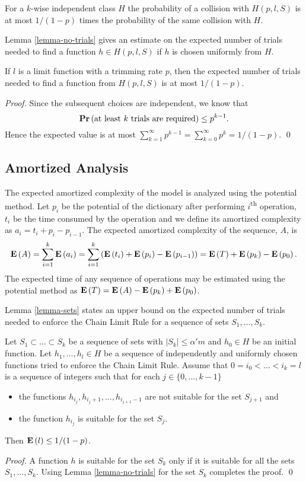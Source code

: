 For a $k$-wise independent class $H$ the probability of a collision with $H(p, l, S)$ is at most $1 / (1 - p)$ times the probability of the same collision with $H$.

Lemma \ref{lemma-no-trials} gives an estimate on the expected number of trials needed to find a function $h \in H(p, l, S)$ if $h$ is chosen uniformly from $H$.

\begin{lemma}
\label{lemma-no-trials}
If $l$ is a limit function with a trimming rate $p$, then the expected number of trials needed to find a function from $H(p, l, S)$ is at most ${1}/{(1 - p)}$.
\end{lemma}
\begin{proof}
Since the subsequent choices are independent, we know that \[\mathbf{Pr}\left(\mbox{at least }k\mbox{ trials are required}\right) \leq p^{k - 1}.\]
Hence the expected value is at most $\sum_{k = 1}^{\infty} p^{k - 1} = \sum_{k = 0}^{\infty} p^k = {1}/{(1 - p)}.$
\qed
\end{proof}

\subsection{Amortized Analysis}
The expected amortized complexity of the model is analyzed using the potential method. Let $p_i$ be the potential of the dictionary after performing $i$\textsuperscript{th} operation, $t_i$ be the time consumed by the operation and we define its amortized complexity as $a_i = t_i + p_i - p_{i - 1}$. The expected amortized complexity of the sequence, $A$, is
\[
\mathbf{E}\left(A\right) = \sum_{i=1}^{k} \mathbf{E}\left(a_i\right) = \sum_{i = 1}^{k} \left(\mathbf{E}\left(t_i\right) + \mathbf{E}\left(p_i\right) - \mathbf{E}\left(p_{i - 1}\right)\right) = \mathbf{E}\left(T\right) + \mathbf{E}\left(p_k\right) - \mathbf{E}\left(p_0\right).
\]
The expected time of any sequence of operations may be estimated using the potential method as $\mathbf{E}\left(T\right) = \mathbf{E}\left(A\right) - \mathbf{E}\left(p_k\right) + \mathbf{E}\left(p_0\right)$.

Lemma \ref{lemma-sets} states an upper bound on the expected number of trials needed to enforce the Chain Limit Rule for a sequence of sets $S_1, \dots, S_k$.
\begin{lemma}
\label{lemma-sets}
Let $S_1 \subset \dots \subset S_k$ be a sequence of sets with $|S_k| \leq \alpha' m$ and $h_0 \in H$ be an initial function. Let $h_1, \dots, h_l \in H$ be a sequence of independently and uniformly chosen functions tried to enforce the Chain Limit Rule. Assume that $0 = i_0 < \dots < i_k = l$ is a sequence of integers such that for each $j \in \{0, \dots, k - 1\}$
\begin{itemize}
\item the functions $h_{i_{j}}, h_{i_{j} + 1}, \dots, h_{i_{j + 1} - 1}$ are not suitable for the set $S_{j + 1}$ and 
\item the function $h_{i_{j}}$ is suitable for the set $S_j$.
\end{itemize}
Then $\mathbf{E}\left(l\right) \leq {1}/{(1 - p)}$.
\end{lemma}
\begin{proof}
A function $h$ is suitable for the set $S_k$ only if it is suitable for all the sets $S_1, \dots, S_k$. Using Lemma \ref{lemma-no-trials} for the set $S_k$ completes the proof.
\qed
\end{proof}

